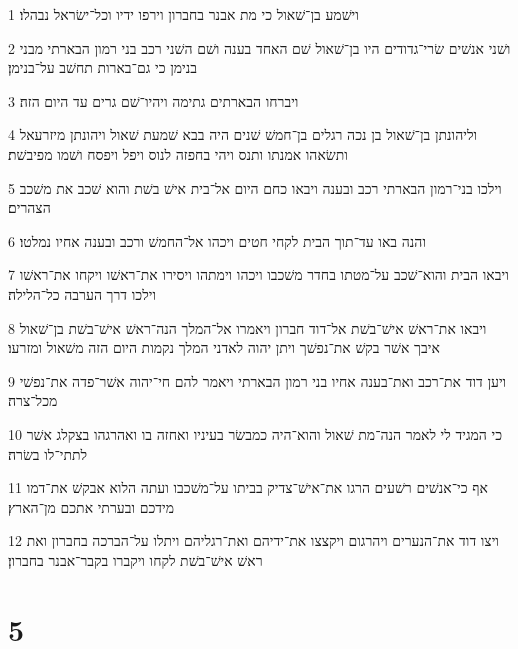 \par 1 וישׁמע בן־שׁאול כי מת אבנר בחברון וירפו ידיו וכל־ישׂראל נבהלו׃
\par 2 ושׁני אנשׁים שׂרי־גדודים היו בן־שׁאול שׁם האחד בענה ושׁם השׁני רכב בני רמון הבארתי מבני בנימן כי גם־בארות תחשׁב על־בנימן׃
\par 3 ויברחו הבארתים גתימה ויהיו־שׁם גרים עד היום הזה׃
\par 4 וליהונתן בן־שׁאול בן נכה רגלים בן־חמשׁ שׁנים היה בבא שׁמעת שׁאול ויהונתן מיזרעאל ותשׂאהו אמנתו ותנס ויהי בחפזה לנוס ויפל ויפסח ושׁמו מפיבשׁת׃
\par 5 וילכו בני־רמון הבארתי רכב ובענה ויבאו כחם היום אל־בית אישׁ בשׁת והוא שׁכב את משׁכב הצהרים׃
\par 6 והנה באו עד־תוך הבית לקחי חטים ויכהו אל־החמשׁ ורכב ובענה אחיו נמלטו׃
\par 7 ויבאו הבית והוא־שׁכב על־מטתו בחדר משׁכבו ויכהו וימתהו ויסירו את־ראשׁו ויקחו את־ראשׁו וילכו דרך הערבה כל־הלילה׃
\par 8 ויבאו את־ראשׁ אישׁ־בשׁת אל־דוד חברון ויאמרו אל־המלך הנה־ראשׁ אישׁ־בשׁת בן־שׁאול איבך אשׁר בקשׁ את־נפשׁך ויתן יהוה לאדני המלך נקמות היום הזה משׁאול ומזרעו׃
\par 9 ויען דוד את־רכב ואת־בענה אחיו בני רמון הבארתי ויאמר להם חי־יהוה אשׁר־פדה את־נפשׁי מכל־צרה׃
\par 10 כי המגיד לי לאמר הנה־מת שׁאול והוא־היה כמבשׂר בעיניו ואחזה בו ואהרגהו בצקלג אשׁר לתתי־לו בשׂרה׃
\par 11 אף כי־אנשׁים רשׁעים הרגו את־אישׁ־צדיק בביתו על־משׁכבו ועתה הלוא אבקשׁ את־דמו מידכם ובערתי אתכם מן־הארץ׃
\par 12 ויצו דוד את־הנערים ויהרגום ויקצצו את־ידיהם ואת־רגליהם ויתלו על־הברכה בחברון ואת ראשׁ אישׁ־בשׁת לקחו ויקברו בקבר־אבנר בחברון׃

\chapter{5}

